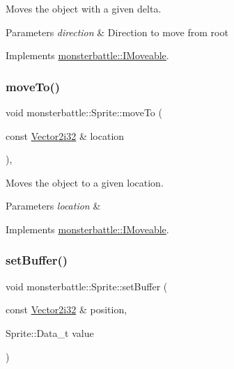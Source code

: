 Moves the object with a given delta. 


\begin{DoxyParams}{Parameters}
{\em direction} & Direction to move from root \\
\hline
\end{DoxyParams}


Implements \hyperlink{structmonsterbattle_1_1IMoveable_a487ec192d82b97e4c5b6d4706fc8db17}{monsterbattle\+::\+I\+Moveable}.

\mbox{\label{classmonsterbattle_1_1Sprite_adf499d36bc202a30c3313a98d9f93d6f}} 
\subsubsection{\texorpdfstring{move\+To()}{moveTo()}}
{\footnotesize\ttfamily void monsterbattle\+::\+Sprite\+::move\+To (\begin{DoxyParamCaption}\item[{const \hyperlink{structmonsterbattle_1_1Vector}{Vector2i32} \&}]{location }\end{DoxyParamCaption})\hspace{0.3cm}{\ttfamily [override]}, {\ttfamily [virtual]}}



Moves the object to a given location. 


\begin{DoxyParams}{Parameters}
{\em location} & \\
\hline
\end{DoxyParams}


Implements \hyperlink{structmonsterbattle_1_1IMoveable_a61cc433b2a635cc3c52d807fc446a6a4}{monsterbattle\+::\+I\+Moveable}.

\mbox{\label{classmonsterbattle_1_1Sprite_a58a163699896d4199cb4935c44a40d45}} 
\subsubsection{\texorpdfstring{set\+Buffer()}{setBuffer()}\hspace{0.1cm}{\footnotesize\ttfamily [1/2]}}
{\footnotesize\ttfamily void monsterbattle\+::\+Sprite\+::set\+Buffer (\begin{DoxyParamCaption}\item[{const \hyperlink{structmonsterbattle_1_1Vector}{Vector2i32} \&}]{position,  }\item[{Sprite\+::\+Data\+\_\+t}]{value }\end{DoxyParamCaption})}



